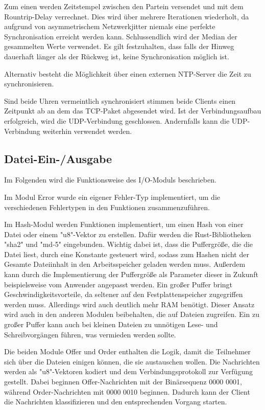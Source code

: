 Zum einen werden Zeitstempel zwischen den Partein versendet und mit dem Rountrip-Delay verrechnet. Dies wird über mehrere Iterationen wiederholt, da aufgrund von asymmetrischem Netzwerkjitter niemals eine perfekte Synchronisation erreicht werden kann. Schlussendlich wird der Median der gesammelten Werte verwendet. Es gilt festzuhalten, dass falls der Hinweg dauerhaft länger als der Rückweg ist, keine Synchronisation möglich ist.

Alternativ besteht die Möglichkeit über einen externen NTP-Server die Zeit zu synchronisieren.

Sind beide Uhren vermeintlich synchronisiert stimmen beide Clients einen Zeitpunkt ab an dem das TCP-Paket abgesendet wird. Ist der Verbindungsaufbau erfolgreich, wird die UDP-Verbindung geschlossen. Andernfalls kann die UDP-Verbindung weiterhin verwendet werden.

\subsection{Datei-Ein-/Ausgabe}
Im Folgenden wird die Funktionsweise des I/O-Moduls beschrieben.

Im Modul Error wurde ein eigener Fehler-Typ implementiert, um die verschiedenen Fehlertypen in den Funktionen zusammenzuführen.

Im Hash-Modul werden Funktionen implementiert, um einen Hash von einer Datei oder einem "u8"-Vektor zu erstellen. Dafür werden die Rust-Bibliotheken "sha2" und "md-5" eingebunden. 
Wichtig dabei ist, dass die Puffergröße, die die Datei liest, durch eine Konstante gesteuert wird, sodass zum Hashen nicht der Gesamte Dateiinhalt in den Arbeitsspeicher geladen werden muss.
Außerdem kann durch die Implementierung der Puffergröße als Parameter dieser in Zukunft beispielsweise vom Anwender angepasst werden. Ein großer Puffer bringt Geschwindigkeitsvorteile, da seltener auf den Festplattenspeicher zugegriffen werden muss. Allerdings wird auch deutlich mehr RAM benötigt. Dieser Ansatz wird auch in den anderen Modulen beibehalten, die auf Dateien zugreifen. Ein zu großer Puffer kann auch bei kleinen Dateien zu unnötigen Lese- und Schreibvorgängen führen, was vermieden werden sollte.

Die beiden Module Offer und Order enthalten die Logik, damit die Teilnehmer sich über die Dateien einigen können, die sie austauschen wollen.
Die Nachrichten werden als "u8"-Vektoren kodiert und dem Verbindungsprotokoll zur Verfügung gestellt. Dabei beginnen Offer-Nachrichten mit der Binärsequenz 0000 0001, während Order-Nachrichten mit 0000 0010 beginnen.
Dadurch kann der Client die Nachrichten klassifizieren und den entsprechenden Vorgang starten.

